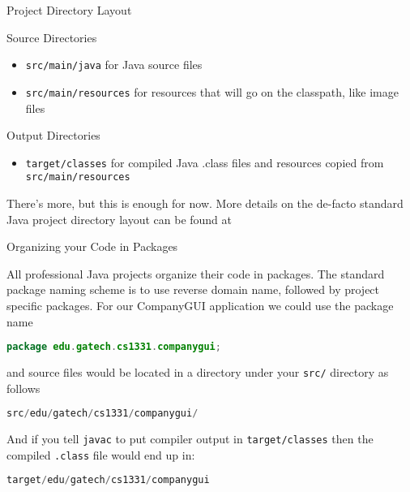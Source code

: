 \documentclass{beamer}
\begin{document}
\begin{frame}[fragile]{Project Directory Layout}


Source Directories
\begin{itemize}
\item {\tt src/main/java} for Java source files
\item {\tt src/main/resources} for resources that will go on the classpath, like image files
\end{itemize}

Output Directories
\begin{itemize}
\item {\tt target/classes} for compiled Java .class files and resources copied from {\tt src/main/resources}
\end{itemize}

There's more, but this is enough for now.  More details on the de-facto standard Java project directory layout can be found at 

\end{frame}

\begin{frame}[fragile]{Organizing your Code in Packages}


All professional Java projects organize their code in packages.  The standard package naming scheme is to use reverse domain name, followed by project specific packages.  For our CompanyGUI application we could use the package name
\vspace{-.05in}
\begin{lstlisting}[language=Java]
package edu.gatech.cs1331.companygui;
\end{lstlisting}
and source files would be located in a directory under your {\tt src/} directory as follows
\begin{lstlisting}[language=Java]
src/edu/gatech/cs1331/companygui/
\end{lstlisting}
\vspace{-.05in}
And if you tell {\tt javac} to put compiler output in {\tt target/classes} then the compiled {\tt .class} file would end up in:
\begin{lstlisting}[language=Java]
target/edu/gatech/cs1331/companygui
\end{lstlisting}
\vspace{-.05in}


\end{frame}
\end{document}
